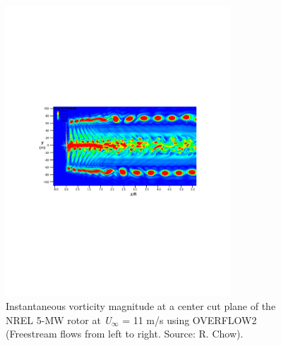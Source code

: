 \begin{figure}[htbp]
\centering
 \includegraphics[width=0.75\textwidth]{Figures/ch5Figures/VortMag}
 \caption{ Instantaneous vorticity magnitude at a center cut plane of the NREL 5-MW rotor at \emph{U$_\infty$} = 11 m/s using OVERFLOW2 (Freestream flows from left to right. Source: R. Chow). }
 \label{vortMag}
\end{figure}   

